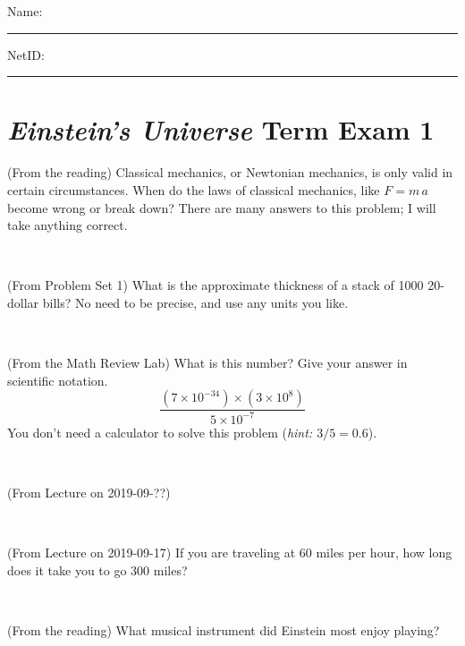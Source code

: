 \documentclass[12pt, letterpaper]{article}
\begin{document}
\cleardoublepage



\noindent
Name: \rule[-1ex]{0.60\textwidth}{0.1pt}
NetID: \rule[-1ex]{0.20\textwidth}{0.1pt}

\section*{\textsl{Einstein's Universe} Term Exam 1}
\setcounter{problem}{1}


\begin{problem} (From the reading)
Classical mechanics, or Newtonian mechanics, is only valid in certain
circumstances. When do the laws of classical mechanics, like $F =
m\,a$ become wrong or break down? There are many answers to this
problem; I will take anything correct.
\end{problem}


\vfill ~

\begin{problem} (From Problem Set 1)
What is the approximate thickness of a stack of 1000 20-dollar bills?
No need to be precise, and use any units you like.
\end{problem}


\vfill ~

\begin{problem} (From the Math Review Lab)
What is this number? Give your answer in scientific notation.
$$
\frac{(7\times10^{-34})\times(3\times10^8)}{5\times10^{-7}}
$$
You don't need a calculator to solve this problem (\textit{hint: $3/5=0.6$}).
\end{problem}


\vfill ~

\begin{problem} (From Lecture on 2019-09-??)
\end{problem}


\vfill ~


\clearpage


\begin{problem} (From Lecture on 2019-09-17)
If you are traveling at 60 miles per hour, how long does
it take you to go 300 miles?
\end{problem}


\vfill ~

\begin{problem} (From the reading)
What musical instrument did Einstein most enjoy playing?
\end{problem}


\vfill ~
\end{document}
